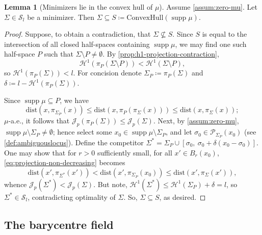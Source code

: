 \documentclass[preprint, reqno]{amsart}
\DeclareMathOperator*{\supp}{supp}
\newcommand{\dist}{\mathrm{dist}}
\theoremstyle{definition}
\newtheorem{lemma}[definition]{Lemma}
\numberwithin{equation}{section}
\begin{document}
\begin{lemma}[Minimizers lie in the convex hull of
  $\mu$]\label{thm:optimizers-in-chull} Assume
  \eqref{assum:zero-mu}. Let $\Sigma \in \mathcal{S}_l$ be a
  minimizer. Then $\Sigma \subseteq S \coloneqq
  \mathrm{ConvexHull}(\supp \mu)$.
\end{lemma}
\begin{proof}
  Suppose, to obtain a contradiction, that $\Sigma \not \subseteq S$.
  Since $S$ is equal to the intersection of all closed half-spaces
  containing $\supp \mu$, we may find one such half-space $P$ such
  that $\Sigma \setminus P \ne \emptyset$. By
  \cref{prop:h1-projection-contraction},
  \[
    \mathcal{H}^1(\pi_P(\Sigma \setminus P)) < \mathcal{H}^1(\Sigma
    \setminus P),
  \]
  so $\mathcal{H}^1(\pi_{P}(\Sigma)) < l$. For concision denote
  $\Sigma_P \coloneqq \pi_P(\Sigma)$ and $\delta \coloneqq l -
  \mathcal H^1(\pi_{P}(\Sigma))$.

  Since $\supp \mu \subseteq P$, we have
  \begin{equation}
    \dist(x, \pi_{\Sigma_P}(x)) \leq \dist(x,
    \pi_{P}(\pi_{\Sigma}(x))) \leq \dist(x,
    \pi_{\Sigma}(x)); \label{eq:projection-non-decreasing}
  \end{equation}
  $\mu$-a.e., it follows that \(\mathscr{J}_p(\pi_{P}(\Sigma)) \leq
  \mathscr{J}_p(\Sigma).\) Next, by \eqref{assum:zero-mu}, $\supp \mu
  \setminus \Sigma_P \neq \emptyset$; hence select some $x_0 \in \supp
  \mu \setminus \Sigma_P$, and let $\sigma_0 \in \mathcal
  P_{\Sigma_P}(x_0)$ (see \cref{def:ambiguouslocus}). Define the
  competitor $\Sigma^* = \Sigma_P \cup [\sigma_0,\ \sigma_0 +
  \delta(x_0 - \sigma_0)]$. One may show that for $r > 0$ sufficiently
  small, for all $x' \in B_r(x_0)$,
  \eqref{eq:projection-non-decreasing} becomes
  \[
    \dist(x', \pi_{\Sigma^*}(x')) < \dist(x', \pi_{\Sigma_P}(x_0))
    \leq \dist(x', \pi_\Sigma(x')),
  \]
  whence $\mathscr J_p(\Sigma^*) < \mathscr J_p(\Sigma)$. But note,
  $\mathcal H^1(\Sigma^*) \leq \mathcal H^1(\Sigma_P) + \delta = l$,
  so $\Sigma^* \in \mathcal S_l$, contradicting optimality of
  $\Sigma$. So, $\Sigma \subseteq S$, as desired.
\end{proof}


\subsection{The barycentre field}\label{subsec:thebarycentrefield}
\end{document}
